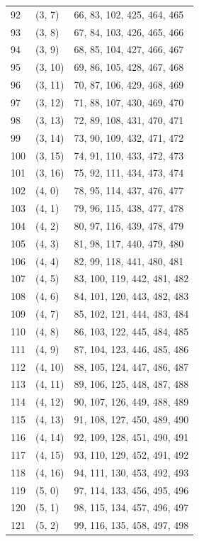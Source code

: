 \documentclass{article}
\begin{document}
\begin{longtable}{lll}
  92 & (3, 7) & 66, 83, 102, 425, 464, 465 \\
  93 & (3, 8) & 67, 84, 103, 426, 465, 466 \\
  94 & (3, 9) & 68, 85, 104, 427, 466, 467 \\
  95 & (3, 10) & 69, 86, 105, 428, 467, 468 \\
  96 & (3, 11) & 70, 87, 106, 429, 468, 469 \\
  97 & (3, 12) & 71, 88, 107, 430, 469, 470 \\
  98 & (3, 13) & 72, 89, 108, 431, 470, 471 \\
  99 & (3, 14) & 73, 90, 109, 432, 471, 472 \\
  100 & (3, 15) & 74, 91, 110, 433, 472, 473 \\
  101 & (3, 16) & 75, 92, 111, 434, 473, 474 \\
  102 & (4, 0) & 78, 95, 114, 437, 476, 477 \\
  103 & (4, 1) & 79, 96, 115, 438, 477, 478 \\
  104 & (4, 2) & 80, 97, 116, 439, 478, 479 \\
  105 & (4, 3) & 81, 98, 117, 440, 479, 480 \\
  106 & (4, 4) & 82, 99, 118, 441, 480, 481 \\
  107 & (4, 5) & 83, 100, 119, 442, 481, 482 \\
  108 & (4, 6) & 84, 101, 120, 443, 482, 483 \\
  109 & (4, 7) & 85, 102, 121, 444, 483, 484 \\
  110 & (4, 8) & 86, 103, 122, 445, 484, 485 \\
  111 & (4, 9) & 87, 104, 123, 446, 485, 486 \\
  112 & (4, 10) & 88, 105, 124, 447, 486, 487 \\
  113 & (4, 11) & 89, 106, 125, 448, 487, 488 \\
  114 & (4, 12) & 90, 107, 126, 449, 488, 489 \\
  115 & (4, 13) & 91, 108, 127, 450, 489, 490 \\
  116 & (4, 14) & 92, 109, 128, 451, 490, 491 \\
  117 & (4, 15) & 93, 110, 129, 452, 491, 492 \\
  118 & (4, 16) & 94, 111, 130, 453, 492, 493 \\
  119 & (5, 0) & 97, 114, 133, 456, 495, 496 \\
  120 & (5, 1) & 98, 115, 134, 457, 496, 497 \\
  121 & (5, 2) & 99, 116, 135, 458, 497, 498 \\

\end{longtable}
\end{document}

